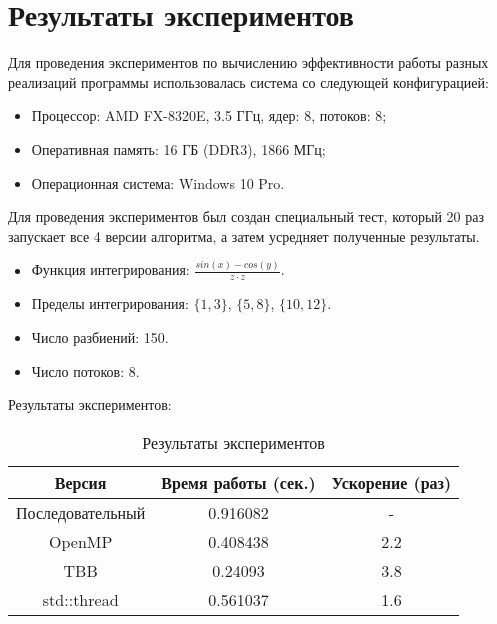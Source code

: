 \documentclass{report}
\begin{document}
\section*{Результаты экспериментов}
Для проведения экспериментов по вычислению эффективности работы разных реализаций программы использовалась система со следующей конфигурацией:
\begin{itemize}
\item Процессор: AMD FX-8320E, 3.5 ГГц, ядер: 8, потоков: 8;
\item Оперативная память: 16 ГБ (DDR3), 1866 МГц;
\item Операционная система: Windows 10 Pro.
\end{itemize}

\par Для проведения экспериментов был создан специальный тест, который 20 раз запускает все 4 версии алгоритма, а затем усредняет полученные результаты.  
\begin{itemize}
    \item Функция интегрирования: $\frac{sin(x) - cos(y)}{z \cdot z}$.
    \item Пределы интегрирования: $\{1, 3\}$, $\{5, 8\}$, $\{10, 12\}$.
    \item Число разбиений: 150.
    \item Число потоков: 8.
\end{itemize}

\par Результаты экспериментов:
\begin{table}[!h]
\centering
\begin{tabular}{| c | c | c |}
\hline
Версия & Время работы (сек.) & Ускорение (раз) \\
\hline
Последовательный        & 0.916082        & -         \\
OpenMP        & 0.408438        & 2.2          \\
TBB       & 0.24093        & 3.8         \\
std::thread        & 0.561037        & 1.6           \\
\hline
\end{tabular}
\caption{Результаты экспериментов}
\end{table}

\newpage

\end{document}
